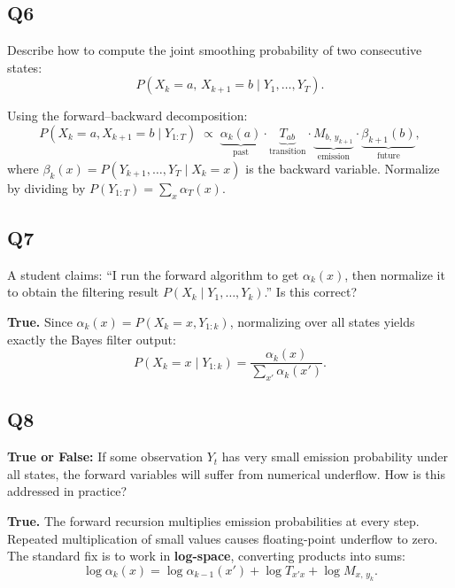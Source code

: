 \documentclass[12pt]{article}
\begin{document}
\subsection*{Q6}
\begin{tcolorbox}[questionbox]
Describe how to compute the joint smoothing probability of two consecutive states:
\[
  P(X_k = a,\, X_{k+1} = b \mid Y_1, \ldots, Y_T).
\]
\end{tcolorbox}

\begin{tcolorbox}[answerbox]
Using the forward--backward decomposition:
\[
  P(X_k = a, X_{k+1} = b \mid Y_{1:T})
  \;\propto\;
  \underbrace{\alpha_k(a)}_{\text{past}}
  \cdot
  \underbrace{T_{ab}}_{\text{transition}}
  \cdot
  \underbrace{M_{b,\, y_{k+1}}}_{\text{emission}}
  \cdot
  \underbrace{\beta_{k+1}(b)}_{\text{future}},
\]
where $\beta_k(x) = P(Y_{k+1}, \ldots, Y_T \mid X_k = x)$ is the backward variable.
Normalize by dividing by $P(Y_{1:T}) = \sum_{x} \alpha_T(x)$.
\end{tcolorbox}

\subsection*{Q7}
\begin{tcolorbox}[questionbox]
A student claims: ``I run the forward algorithm to get $\alpha_k(x)$, then normalize
it to obtain the filtering result $P(X_k \mid Y_1, \ldots, Y_k)$.'' Is this correct?
\end{tcolorbox}

\begin{tcolorbox}[answerbox]
\textbf{True.} Since $\alpha_k(x) = P(X_k = x, Y_{1:k})$, normalizing over all
states yields exactly the Bayes filter output:
\[
  P(X_k = x \mid Y_{1:k}) = \frac{\alpha_k(x)}{\sum_{x'} \alpha_k(x')}.
\]
\end{tcolorbox}

\subsection*{Q8}
\begin{tcolorbox}[questionbox]
\textbf{True or False:} If some observation $Y_t$ has very small emission probability
under all states, the forward variables will suffer from numerical underflow.
How is this addressed in practice?
\end{tcolorbox}

\begin{tcolorbox}[answerbox]
\textbf{True.} The forward recursion multiplies emission probabilities at every
step. Repeated multiplication of small values causes floating-point underflow to
zero. The standard fix is to work in \textbf{log-space}, converting products into
sums:
\[
  \log \alpha_k(x) = \log \alpha_{k-1}(x') + \log T_{x'x} + \log M_{x,\, y_k}.
\]
\end{tcolorbox}
\end{document}
